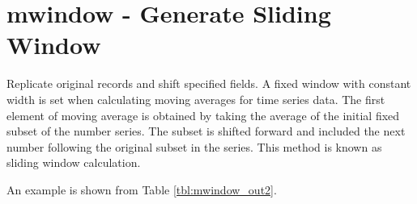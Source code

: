 
%

\section{mwindow - Generate Sliding Window\label{sect:mwindow}}
Replicate original records and shift specified fields. A fixed window with constant width is set when calculating moving averages for time series data. The first element of moving average is obtained by taking the average of the initial fixed subset of the number series. The subset is shifted forward and included the next number following the original subset in the series.  This method is known as sliding window calculation. 

An example is shown from Table \ref{tbl:mwindow_out2}.

